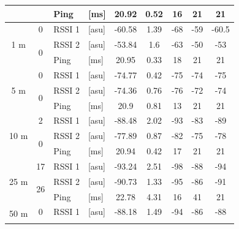 \begin{table}[H]
\begin{tabular}{|c|c|l|l|c|c|c|c|c|}
        && Ping & [ms] & 20.92 & 0.52 & 16 & 21 & 21 \\\hline\hline
        \multirow{3}{*}{1 m} & \multirow{1}{*}{0} & RSSI 1 & [asu] & -60.58 & 1.39 & -68 & -59 & -60.5 \\\cline{2-9}\cline{2-9}
        & \multirow{2}{*}{0} & RSSI 2 & [asu] & -53.84 & 1.6 & -63 & -50 & -53 \\\cline{3-9}
        && Ping & [ms] & 20.95 & 0.33 & 18 & 21 & 21 \\\hline\hline
        \multirow{3}{*}{5 m} & \multirow{1}{*}{0} & RSSI 1 & [asu] & -74.77 & 0.42 & -75 & -74 & -75 \\\cline{2-9}\cline{2-9}
        & \multirow{2}{*}{0} & RSSI 2 & [asu] & -74.36 & 0.76 & -76 & -72 & -74 \\\cline{3-9}
        && Ping & [ms] & 20.9 & 0.81 & 13 & 21 & 21 \\\hline\hline
        \multirow{3}{*}{10 m} & \multirow{1}{*}{2} & RSSI 1 & [asu] & -88.48 & 2.02 & -93 & -83 & -89 \\\cline{2-9}\cline{2-9}
        & \multirow{2}{*}{0} & RSSI 2 & [asu] & -77.89 & 0.87 & -82 & -75 & -78 \\\cline{3-9}
        && Ping & [ms] & 20.94 & 0.42 & 17 & 21 & 21 \\\hline\hline
        \multirow{3}{*}{25 m} & \multirow{1}{*}{17} & RSSI 1 & [asu] & -93.24 & 2.51 & -98 & -88 & -94 \\\cline{2-9}\cline{2-9}
        & \multirow{2}{*}{26} & RSSI 2 & [asu] & -90.73 & 1.33 & -95 & -86 & -91 \\\cline{3-9}
        && Ping & [ms] & 22.78 & 4.31 & 16 & 41 & 21 \\\hline\hline
        \multirow{3}{*}{50 m} & \multirow{1}{*}{0} & RSSI 1 & [asu] & -88.18 & 1.49 & -94 & -86 & -88 \\\cline{2-9}\cline{2-9}

\end{tabular}
\end{table}
